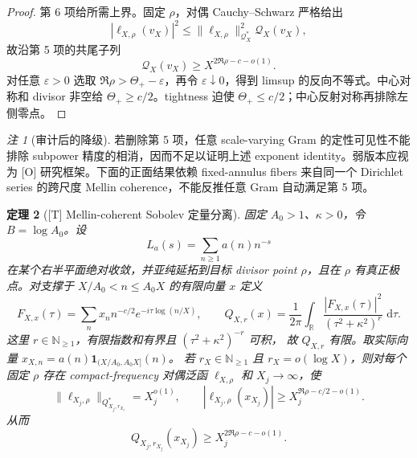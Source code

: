 \documentclass[UTF8,11pt,a4paper]{ctexart}
\newtheorem{theorem}{定理}[section]
\theoremstyle{definition}
\theoremstyle{remark}
\newtheorem{remark}[theorem]{注}
\newcommand{\R}{\mathbb R}
\newcommand{\dd}{\,\mathrm d}
\newcommand{\1}{\mathbf 1}
\newcommand{\cQ}{\mathcal Q}
\newcommand{\statusT}{\textnormal{[T]}}
\newcommand{\statusO}{\textnormal{[O]}}
\begin{document}
\begin{proof}
第 6 项给所需上界。固定 $\rho$，对偶 Cauchy--Schwarz 严格给出
\[
 |\ell_{X,\rho}(v_X)|^2
 \leq \|\ell_{X,\rho}\|_{\cQ_X^*}^2\cQ_X(v_X),
\]
故沿第 5 项的共尾子列
\[
  \cQ_X(v_X)\geq X^{2\Re\rho-c-o(1)}.
\]
对任意 $\varepsilon>0$ 选取 $\Re\rho>\Theta_+-\varepsilon$，再令 $\varepsilon\downarrow0$，得到 limsup 的反向不等式。中心对称和 divisor 非空给 $\Theta_+\geq c/2$。tightness 迫使 $\Theta_+\leq c/2$；中心反射对称再排除左侧零点。
\end{proof}

\begin{remark}[审计后的降级]
若删除第 5 项，任意 scale-varying Gram 的定性可见性不能排除 subpower 精度的相消，因而不足以证明上述 exponent identity。弱版本应视为 \statusO{} 研究框架。下面的正面结果依赖 fixed-annulus fibers 来自同一个 Dirichlet series 的跨尺度 Mellin coherence，不能反推任意 Gram 自动满足第 5 项。
\end{remark}

\begin{theorem}[\statusT{} Mellin-coherent Sobolev 定量分离]\label{thm:mellin-dual}
固定 $A_0>1$、$\kappa>0$，令 $B=\log A_0$。设
\[
 L_a(s)=\sum_{n\geq1}a(n)n^{-s}
\]
在某个右半平面绝对收敛，并亚纯延拓到目标 divisor point $\rho$，且在 $\rho$ 有真正极点。对支撑于 $X/A_0<n\leq A_0X$ 的有限向量 $x$ 定义
\[
 F_{X,x}(\tau)=\sum_nx_n n^{-c/2}e^{-i\tau\log(n/X)},\qquad
 Q_{X,r}(x)=\frac1{2\pi}\int_\R
 \frac{|F_{X,x}(\tau)|^2}{(\tau^2+\kappa^2)^r}\,\dd\tau .
\]
这里 $r\in\mathbb N_{\ge1}$，有限指数和有界且 $(\tau^2+\kappa^2)^{-r}$ 可积，
故 $Q_{X,r}$ 有限。取实际向量 $x_{X,n}=a(n)\1_{(X/A_0,A_0X]}(n)$。
若 $r_X\in\mathbb N_{\ge1}$ 且 $r_X=o(\log X)$，则对每个固定 $\rho$ 存在 compact-frequency 对偶泛函 $\ell_{X,\rho}$ 和 $X_j\to\infty$，使
\[
 \|\ell_{X_j,\rho}\|_{Q_{X_j,r_{X_j}}^*}=X_j^{o(1)},\qquad
 |\ell_{X_j,\rho}(x_{X_j})|
 \geq X_j^{\Re\rho-c/2-o(1)}.
\]
从而
\[
 Q_{X_j,r_{X_j}}(x_{X_j})
 \geq X_j^{2\Re\rho-c-o(1)}.
\]
\end{theorem}
\end{document}
